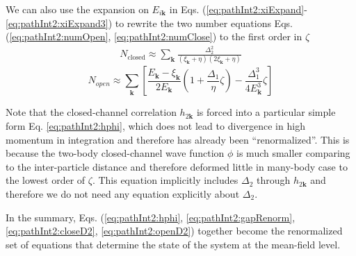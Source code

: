 \documentclass[reprint,pra]{revtex4-1}
\newcommand{\vk}{\ensuremath{\mathbf{k}}}
\newcommand{\mbr}[1]{\ensuremath{\left[#1\right]}}
\begin{document}
We can also use the expansion on $E_{i\vk}$ in Eqs. (\ref{eq:pathInt2:xiExpand}-\ref{eq:pathInt2:xiExpand3}) to rewrite the two number equations Eqs. (\ref{eq:pathInt2:numOpen}, \ref{eq:pathInt2:numClose}) to the first order in $\zeta$ 
\begin{gather}\label{eq:pathInt2:closeD2}
N_{\text{closed}}\approx\sum_{\vk}\frac{\Delta_{2}^2}{(\xi_{\vk}+\eta)(2\xi_{\vk}+\eta)}
\end{gather}
\begin{equation}\label{eq:pathInt2:openD2}
N_{open}\approx\sum_\vk\mbr{\frac{E_\vk-\xi_\vk}{2E_\vk}(1+\frac{\Delta_{1}}{\eta}\zeta)-\frac{\Delta_{1}^{3}}{4E_\vk^{3}}\zeta	}	
\end{equation}

Note that the closed-channel correlation $h_{2\vk}$ is forced into a particular simple form Eq. \ref{eq:pathInt2:hphi}, which does not lead to divergence in high momentum in integration and therefore has already been ``renormalized''.  This is  because the two-body closed-channel wave function $\phi$ is much smaller comparing to the inter-particle distance and therefore deformed little in many-body case to the lowest order  of $\zeta$. 
This equation implicitly includes $\Delta_2$ through $h_{2\vk}$ and therefore we do not need any equation explicitly about $\Delta_2$. 

In the summary, Eqs. (\ref{eq:pathInt2:hphi}, \ref{eq:pathInt2:gapRenorm}, \ref{eq:pathInt2:closeD2}, \ref{eq:pathInt2:openD2}) together become the renormalized set of equations that determine the state of the system at the mean-field level. 
\end{document}
